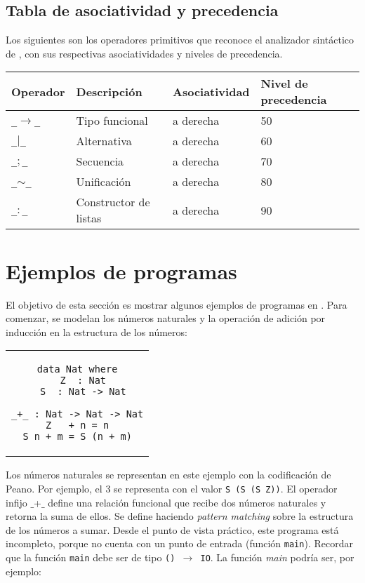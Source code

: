 \subsection{Tabla de asociatividad y precedencia}

Los siguientes son los operadores primitivos que reconoce el analizador
sintáctico de \nuflo, con sus respectivas asociatividades y niveles de
precedencia.
\medskip

\begin{tabular}{l|l|l|l}
{\bf Operador} & {\bf Descripción} & {\bf Asociatividad} & {\bf Nivel de precedencia} \\
\hline
  \texttt{\_$\to$\_}
  &
  Tipo funcional
  &
  a derecha
  &
  50
\\
  \texttt{\_$\mid$\_}
  &
  Alternativa
  &
  a derecha
  &
  60
\\
  \texttt{\_$;$\_}
  &
  Secuencia
  &
  a derecha
  &
  70
\\
  \texttt{\_$\sim$\_}
  &
  Unificación
  &
  a derecha
  &
  80
\\
  \texttt{\_$:$\_}
  &
  Constructor de listas
  &
  a derecha
  &
  90
\end{tabular}

\section{Ejemplos de programas \nuflo}

El objetivo de esta sección es mostrar algunos ejemplos de programas en \nuflo.
Para comenzar, se modelan los números naturales y la operación de adición
por inducción en la estructura de los números:

\begin{center}
\begin{tabular}{c}
\begin{lstlisting}[mathescape=true]
data Nat where
  Z  : Nat
  S  : Nat -> Nat

_+_ : Nat -> Nat -> Nat
Z   + n = n
S n + m = S (n + m)
\end{lstlisting}
\end{tabular}
\end{center}
Los números naturales se representan en este ejemplo con la codificación de Peano.
Por ejemplo, el $3$ se representa con el valor \verb|S (S (S Z))|.
El operador infijo $\_$+$\_$ define una relación funcional que recibe dos números
naturales y retorna la suma de ellos. Se define haciendo {\em pattern matching} sobre la
estructura de los números a sumar.
Desde el punto de vista práctico, este programa está incompleto,
porque no cuenta con un punto de entrada (función \verb|main|).
Recordar que la función \verb|main| debe ser de tipo \texttt{() $\to$ IO}.
La función {\em main} podría ser, por ejemplo:

